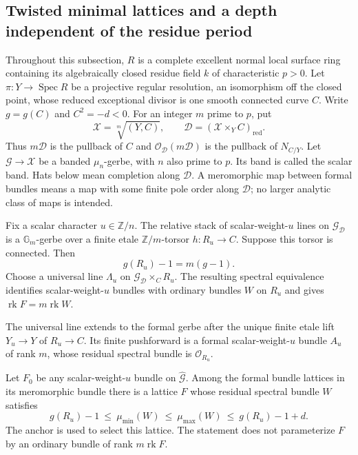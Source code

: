 \subsection{Twisted minimal lattices and a depth independent of the residue period}

Throughout this subsection, $R$ is a complete excellent normal local
surface ring containing its algebraically closed residue field $k$ of
characteristic $p>0$. Let $\pi:Y\to\operatorname{Spec}R$ be a
projective regular resolution, an isomorphism off the closed point,
whose reduced exceptional divisor is one smooth connected curve $C$.
Write $g=g(C)$ and $C^2=-d<0$. For an integer $m$ prime to $p$, put
\[
  \mathcal X=\sqrt[m]{(Y,C)},\qquad
  \mathcal D=(\mathcal X\times_Y C)_{\mathrm{red}}.
  \tag{D.TD.1}
\]
Thus $m\mathcal D$ is the pullback of $C$ and
$\mathcal O_{\mathcal D}(m\mathcal D)$ is the pullback of $N_{C/Y}$.
Let $\mathcal G\to\mathcal X$ be a banded $\mu_n$-gerbe, with
$n$ also prime to $p$. Its band is called the scalar band. Hats
below mean completion along $\mathcal D$. A meromorphic map between
formal bundles means a map with some finite pole order along
$\mathcal D$; no larger analytic class of maps is intended.

\begin{lemma}
\label{D:twisted-connected-anchor-minimal-slopes}
Fix a scalar character $u\in\mathbb Z/n$. The relative stack of
scalar-weight-$u$ lines on $\mathcal G_{\mathcal D}$ is a
$\mathbb G_m$-gerbe over a finite etale $\mathbb Z/m$-torsor
$h:R_u\to C$. Suppose this torsor is connected. Then
\[
                 g(R_u)-1=m(g-1).                         \tag{D.TD.2}
\]
Choose a universal line $\Lambda_u$ on
$\mathcal G_{\mathcal D}\times_C R_u$. The resulting spectral
equivalence identifies scalar-weight-$u$ bundles with ordinary
bundles $W$ on $R_u$ and gives $\operatorname{rk}F=m\operatorname{rk}W$.

The universal line extends to the formal gerbe after the unique
finite etale lift $Y_u\to Y$ of $R_u\to C$. Its finite pushforward
is a formal scalar-weight-$u$ bundle $A_u$ of rank $m$, whose
residual spectral bundle is $\mathcal O_{R_u}$.

Let $F_0$ be any scalar-weight-$u$ bundle on $\widehat{\mathcal G}$.
Among the formal bundle lattices in its meromorphic bundle there
is a lattice $F$ whose residual spectral bundle $W$ satisfies
\[
 g(R_u)-1\ \leq\ \mu_{\min}(W)
       \ \leq\ \mu_{\max}(W)
       \ \leq\ g(R_u)-1+d.                              \tag{D.TD.3}
\]
The anchor is used to select this lattice. The statement does not
parameterize $F$ by an ordinary bundle of rank $m\operatorname{rk}F$.
\end{lemma}


